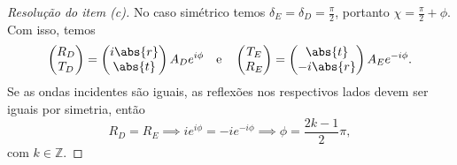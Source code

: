 \begin{proof}[Resolução do item (c)]
    No caso simétrico temos \(\delta_E = \delta_D = \frac{\pi}{2}\), portanto \(\chi = \frac{\pi}{2} + \phi\). Com isso, temos
    \begin{equation*}
        \begin{pmatrix}
            R_D\\
            T_D
        \end{pmatrix}=
        \begin{pmatrix}
            i\abs{r}\\
            \abs{t}
        \end{pmatrix}
        A_De^{i\phi}
        \quad\text{e}\quad
        \begin{pmatrix}
            T_E\\
            R_E
        \end{pmatrix}=
        \begin{pmatrix}
            \abs{t}\\
            -i\abs{r}
        \end{pmatrix}
        A_Ee^{-i\phi}.
    \end{equation*}
    Se as ondas incidentes são iguais, as reflexões nos respectivos lados devem ser iguais por simetria, então
    \begin{equation*}
        R_D = R_E \implies i e^{i\phi} = -i e^{-i\phi} \implies \phi = \frac{2k - 1}{2}\pi,
    \end{equation*}
    com \(k \in \mathbb{Z}\).
\end{proof}
